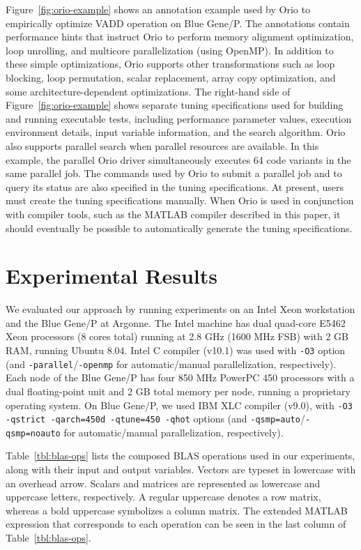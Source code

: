 \documentclass[runningheads]{llncs}
\begin{document}
Figure~\ref{fig:orio-example} shows an annotation example used by Orio to
empirically optimize VADD operation on Blue Gene/P. The annotations contain
performance hints that instruct Orio to perform memory alignment
optimization, loop unrolling, and multicore parallelization (using
OpenMP). In addition to these simple optimizations, Orio supports other
transformations such as loop blocking, loop permutation, scalar replacement,
array copy optimization, and some architecture-dependent optimizations. The
right-hand side of Figure~\ref{fig:orio-example} shows separate tuning
specifications used for building and running executable tests, including
performance parameter values, execution environment details, input variable
information, and the search algorithm. Orio also supports parallel search
when parallel resources are available. In this example, the parallel Orio
driver simultaneously executes 64 code variants in the same parallel job. The
commands used by Orio to submit a parallel job and to query its status are
also specified in the tuning specifications. At present, users must create
the tuning specifications manually. When Orio is used in conjunction with
compiler tools, such as the MATLAB compiler described in this paper, it
should eventually be possible to automatically generate the tuning
specifications.


\section{Experimental Results}
\label{sec:experiments}

We evaluated our approach by running experiments on an Intel Xeon
workstation and the Blue Gene/P at Argonne. The Intel machine has dual
quad-core E5462 Xeon processors (8 cores total) running at 2.8 GHz
(1600 MHz FSB) with 2 GB RAM, running Ubuntu 8.04. Intel C compiler
(v10.1) was used with \texttt{-O3} option (and
\texttt{-parallel}/\texttt{-openmp} for automatic/manual
parallelization, respectively). Each node of the Blue Gene/P has four
850 MHz PowerPC 450 processors with a dual floating-point unit and 2
GB total memory per node, running a proprietary operating system. On
Blue Gene/P, we used IBM XLC compiler (v9.0), with \texttt{-O3
-qstrict -qarch=450d -qtune=450 -qhot} options (and
\texttt{-qsmp=auto}/\texttt{-qsmp=noauto} for automatic/manual
parallelization, respectively).

Table~\ref{tbl:blas-ops} lists the composed BLAS operations used in our
experiments, along with their input and output variables. Vectors are typeset
in lowercase with an overhead arrow. Scalars and matrices are represented as
lowercase and uppercase letters, respectively. A regular uppercase denotes a
row matrix, whereas a bold uppercase symbolizes a column matrix. The extended
MATLAB expression that corresponds to each operation can be seen in the last
column of Table~\ref{tbl:blas-ops}.
\end{document}
